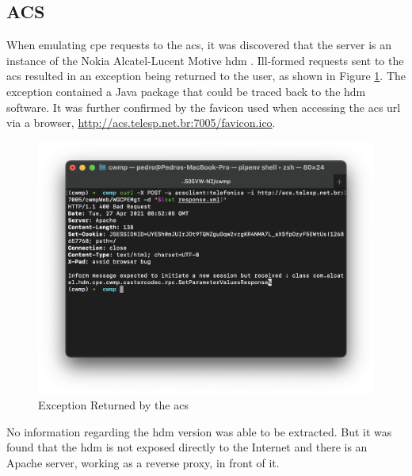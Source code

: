 \subsection{ACS}

When emulating \gls{cpe} requests to the \gls{acs}, it was discovered that the server is an instance of the Nokia Alcatel-Lucent Motive \gls{hdm} \cite{hdm}. Ill-formed requests sent to the \gls{acs} resulted in an exception being returned to the user, as shown in Figure \ref{figure:cwmp_exception}. The exception contained a Java package that could be traced back to the \gls{hdm} software. It was further confirmed by the favicon used when accessing the \gls{acs} \gls{url} via a browser, \url{http://acs.telesp.net.br:7005/favicon.ico}.

\begin{figure}[h]
    \centering
    \includegraphics[width=\linewidth]{contents/isp-side-services-analysis/acs/cwmp-exception.png}
    \caption{Exception Returned by the \gls{acs}}
    \label{figure:cwmp_exception}
\end{figure}

No information regarding the \gls{hdm} version was able to be extracted. But it was found that the \gls{hdm} is not exposed directly to the Internet and there is an Apache server, working as a reverse proxy, in front of it.

\FloatBarrier
